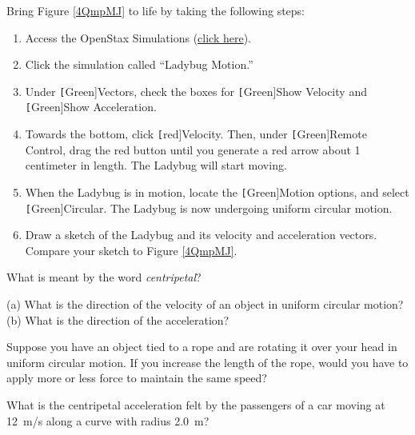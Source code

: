 \documentclass[main.tex]{subfiles}
\begin{document}
\begin{exercise} \label{N066SF}
    Bring Figure \ref{4QmpMJ} to life by taking the following steps:

    \begin{enumerate}
    \setlength\itemsep{0.1ex}
        \item Access the OpenStax Simulations (\href{https://veillette.github.io/simulations/}{click here}).
        \item Click the simulation called ``Ladybug Motion.''
        \item Under \texttt[Green]{Vectors}, check the boxes for \texttt[Green]{Show Velocity} and \texttt[Green]{Show Acceleration}. 
        \item Towards the bottom, click \texttt[red]{Velocity}. Then, under \texttt[Green]{Remote Control}, drag the red button until you generate a red arrow about 1 centimeter in length. The Ladybug will start moving.
        \item When the Ladybug is in motion, locate the \texttt[Green]{Motion} options, and select \texttt[Green]{Circular}. The Ladybug is now undergoing uniform circular motion.
        \item Draw a sketch of the Ladybug and its velocity and acceleration vectors. Compare your sketch to Figure \ref{4QmpMJ}. 
    \end{enumerate}
\end{exercise}

\begin{exercise} \label{x2YCzr}
    What is meant by the word \textit{centripetal}?
\end{exercise}

\begin{exercise} \label{S4rGIt}
    (a) What is the direction of the velocity of an object in uniform circular motion? (b) What is the direction of the acceleration?
\end{exercise}

\begin{exercise} \label{aVu3ZA}
    Suppose you have an object tied to a rope and are rotating it over your head in uniform circular motion. If you increase the length of the rope, would you have to apply more or less force to maintain the same speed?
\end{exercise}

\begin{exercise} \label{kTvEZX}
    What is the centripetal acceleration felt by the passengers of a car moving at \SI{12}{m/s} along a curve with radius \SI{2.0}{m}?
\end{exercise}
\end{document}
